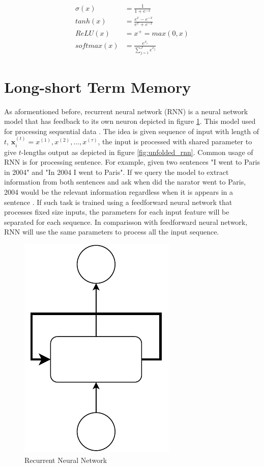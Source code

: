     \begin{align}
        \label{eq:sigmoid}
        \sigma(x) &= \frac{1}{1+e^{-x}} \\
        \label{eq:tanh}
        tanh(x) &= \frac{e^x-e^{-x}}{e^x + e^{-x}}\\
        \label{eq:relu}
        ReLU(x) &= x^+ = max(0, x)\\
        \label{eq:softmax}
        softmax(x) &= \frac{e^{x_i}}{\sum_{j=1}^J e^{x_j}}
    \end{align}

\section{Long-short Term Memory}
    As aformentioned before, recurrent neural network (RNN) is a
    neural network model that has feedback to its own neuron depicted
    in figure \ref{fig:rnn}. This model used for processing sequential
    data \citep{Goodfellow-et-al-2016}. The idea is given sequence of
    input with length of $t$, $\mathbf{x}_i^{(t)} = x^{(1)}, x^{(2)},
    \dots, x^{(\tau)}$, the input is processed with shared parameter to
    give $t$-lengths output as depicted in figure
    \ref{fig:unfolded_rnn}. Common usage of RNN is for processing
    sentence. For example, given two sentences "I went to Paris in
    2004" and "In 2004 I went to Paris". If we query the model to
    extract information from both sentences and ask when did the
    narator went to Paris, 2004 would be the relevant information
    regardless when it is appears in a sentence
    \citep{Goodfellow-et-al-2016}. If such task is trained using a
    feedforward neural network that processes fixed size inputs, the
    parameters for each input feature will be separated for each
    sequence. In comparisson with feedforward neural network, RNN will
    use the same parameters to process all the input sequence. 

    \begin{figure}
        \centering
        \includegraphics[width=.15\linewidth]{images/rnn.pdf}
        \caption{Recurrent Neural Network}
        \label{fig:rnn}
    \end{figure}

